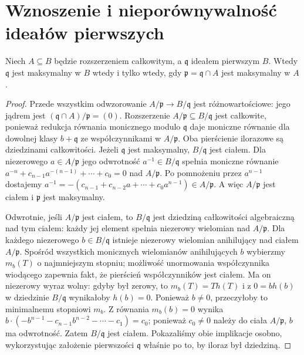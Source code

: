 \section{Wznoszenie i nieporównywalność ideałów pierwszych}
\begin{lemat}\label{aa:lem:integral-maximal}
Niech $A\subseteq B$ będzie rozszerzeniem całkowitym,
a $\mathfrak q$ ideałem pierwszym $B$.
Wtedy $\mathfrak q$ jest maksymalny w $B$ wtedy i tylko wtedy,
gdy $\mathfrak p=\mathfrak q\cap A$ jest maksymalny w $A$.
\end{lemat}
\begin{proof}
Przede wszystkim odwzorowanie
$A/\mathfrak p\to B/\mathfrak q$ jest
różnowartościowe: jego jądrem jest
$(\mathfrak q\cap A)/\mathfrak p=(0)$.
Rozszerzenie $A/\mathfrak p\subseteq B/\mathfrak q$ jest
całkowite, ponieważ redukcja równania monicznego modulo
$\mathfrak q$ daje moniczne równanie dla dowolnej klasy
$b+\mathfrak q$ ze współczynnikami w $A/\mathfrak p$.
Oba pierścienie ilorazowe są dziedzinami całkowitości.
Jeżeli $\mathfrak q$ jest maksymalny, $B/\mathfrak q$ jest ciałem.
Dla niezerowego $a\in A/\mathfrak p$ jego odwrotność
$a^{-1}\in B/\mathfrak q$ spełnia moniczne równanie
$a^{-n}+c_{n-1}a^{-(n-1)}+\cdots+c_0=0$ nad $A/\mathfrak p$.
Po pomnożeniu przez $a^{n-1}$ dostajemy
$a^{-1}=-(c_{n-1}+c_{n-2}a+\cdots+c_0a^{n-1})\in A/\mathfrak p$.
A więc $A/\mathfrak p$ jest ciałem i $\mathfrak p$ jest maksymalny.

Odwrotnie, jeśli $A/\mathfrak p$ jest ciałem, to
$B/\mathfrak q$ jest dziedziną całkowitości algebraiczną
nad tym ciałem: każdy jej element spełnia niezerowy
wielomian nad $A/\mathfrak p$.
Dla każdego niezerowego $b\in B/\mathfrak q$ istnieje
niezerowy wielomian anihilujący nad ciałem $A/\mathfrak p$.
Spośród wszystkich monicznych wielomianów anihilujących
$b$ wybierzmy $m_b(T)$ o najmniejszym stopniu; możliwość
unormowania współczynnika wiodącego zapewnia fakt,
że pierścień współczynników jest ciałem.
Ma on niezerowy wyraz wolny: gdyby był zerowy,
to $m_b(T)=T h(T)$ i z $0=b h(b)$ w dziedzinie
$B/\mathfrak q$ wynikałoby $h(b)=0$. Ponieważ $b\ne0$,
przeczyłoby to minimalnemu stopniowi $m_b$.
Z równania $m_b(b)=0$ wynika
$b\cdot(-b^{n-1}-c_{n-1}b^{n-2}-\cdots-c_1)=c_0$;
ponieważ $c_0\ne0$ należy do ciała $A/\mathfrak p$,
$b$ ma odwrotność. Zatem $B/\mathfrak q$ jest ciałem. Pokazaliśmy obie
implikacje osobno, wykorzystując założenie pierwszości
$\mathfrak q$ właśnie po to, by iloraz był dziedziną.
\end{proof}

